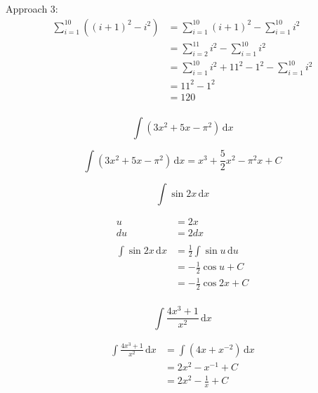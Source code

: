 \documentclass[fleqn,addpoints]{exam}
\begin{document}
\begin{questions}
\begin{solution}[4 cm]
Approach 3:
\begin{align*}
  \sum_{i = 1}^{10} \left( (i+1)^2 - i^2 \right) &= \sum_{i = 1}^{10} (i + 1)^2 - \sum_{i = 1}^{10} i^2 \\
  &= \sum_{i = 2}^{11} i^2 - \sum_{i = 1}^{10} i^2 \\
  &= \sum_{i = 1}^{10} i^2 + 11^2 - 1^2 - \sum_{i = 1}^{10} i^2 \\
  &= 11^2 - 1^2 \\
  &= 120 \\
\end{align*}

\end{solution}

 

\question[5]
\label{indefinite:first}
\[
  \int \left( 3x^2 + 5x - \pi^2 \right) \, \mathrm{d}x
\]
\begin{solution}[4 cm]
\[
  \int \left( 3x^2 + 5x - \pi^2 \right) \, \mathrm{d}x = x^3 + \frac{5}{2} x^2 - \pi^2 x + C
\]
\end{solution}

\question[7]
\[
  \int \sin 2x \, \mathrm{d}x
\]

\begin{solution}[5 cm]
\begin{align*}
  u &= 2x \\
  du &= 2 dx \\
\\
  \int \sin 2x \, \mathrm{d}x &= \frac{1}{2} \int \sin u \, \mathrm{d}u \\
  &= -\frac{1}{2} \cos u + C \\
  &= -\frac{1}{2} \cos 2x + C \\
\end{align*}

\end{solution}

\ifprintanswers
\pagebreak
\fi

\question[7]
\[
  \int \frac{4x^3 + 1}{x^2} \, \mathrm{d}x
\]

\begin{solution}[5 cm]
\begin{align*}
  \int \frac{4x^3 + 1}{x^2} \, \mathrm{d}x &= \int \left( 4x + x^{-2} \right) \, \mathrm{d}x \\
  &= 2x^2 - x^{-1} + C \\
  &= 2x^2 - \frac{1}{x} + C \\
\end{align*}


\end{solution}
\end{questions}
\end{document}
